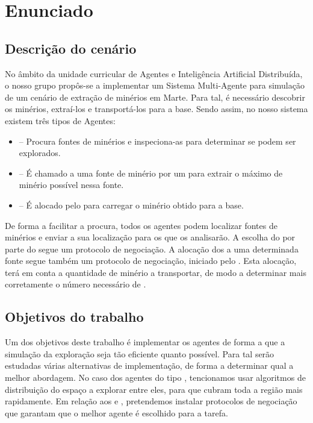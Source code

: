 \documentclass[12pt]{report}
\begin{document}
\newpage
\tableofcontents

\clearpage
\chapter{Enunciado}

\section{Descrição do cenário}
No âmbito da unidade curricular de Agentes e Inteligência Artificial Distribuída, o nosso grupo propôs-se a implementar um Sistema Multi-Agente para simulação de um cenário de extração de minérios em Marte. Para tal, é necessário descobrir os minérios, extraí-los e transportá-los para a base. Sendo assim, no nosso sistema existem três tipos de Agentes:

\begin{itemize}
  \item \Spotter – Procura fontes de minérios e inspeciona-as para determinar se podem ser explorados. 
  \item \Producer – É chamado a uma fonte de minério por um \spotter para extrair o máximo de minério possível nessa fonte. 
  \item \Transporter – É alocado pelo \producer para carregar o minério obtido para a base.
\end{itemize}

De forma a facilitar a procura, todos os agentes podem localizar fontes de minérios e enviar a sua localização para os \spotters que os analisarão. A escolha do \producer por parte do \spotter segue um protocolo de negociação. A alocação dos \transporters a uma determinada fonte segue também um protocolo de negociação, iniciado pelo \producer. Esta alocação, terá em conta a quantidade de minério a transportar, de modo a determinar mais corretamente o número necessário de \transporters.

\section{Objetivos do trabalho}

Um dos objetivos deste trabalho é implementar os agentes de forma a que a simulação da exploração seja tão eficiente quanto possível. Para tal serão estudadas várias alternativas de implementação, de forma a determinar qual a melhor abordagem. No caso dos agentes do tipo \spotter, tencionamos usar algoritmos de distribuição do espaço a explorar entre eles, para que cubram toda a região mais rapidamente. Em relação aos \producers e \transporters, pretendemos instalar protocolos de negociação que garantam que o melhor agente é escolhido para a tarefa.
\end{document}
